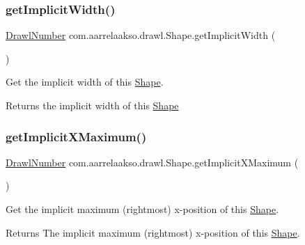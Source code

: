 \subsubsection{\texorpdfstring{get\+Implicit\+Width()}{getImplicitWidth()}}
{\footnotesize\ttfamily \hyperlink{classcom_1_1aarrelaakso_1_1drawl_1_1_drawl_number}{Drawl\+Number} com.\+aarrelaakso.\+drawl.\+Shape.\+get\+Implicit\+Width (\begin{DoxyParamCaption}{ }\end{DoxyParamCaption})\hspace{0.3cm}{\ttfamily [protected]}}



Get the implicit width of this \hyperlink{classcom_1_1aarrelaakso_1_1drawl_1_1_shape}{Shape}. 

\begin{DoxyReturn}{Returns}
the implicit width of this \hyperlink{classcom_1_1aarrelaakso_1_1drawl_1_1_shape}{Shape} 
\end{DoxyReturn}
\mbox{\label{classcom_1_1aarrelaakso_1_1drawl_1_1_shape_ae1820c7d674c6c022b72cc086005131f}} 
\subsubsection{\texorpdfstring{get\+Implicit\+X\+Maximum()}{getImplicitXMaximum()}}
{\footnotesize\ttfamily \hyperlink{classcom_1_1aarrelaakso_1_1drawl_1_1_drawl_number}{Drawl\+Number} com.\+aarrelaakso.\+drawl.\+Shape.\+get\+Implicit\+X\+Maximum (\begin{DoxyParamCaption}{ }\end{DoxyParamCaption})\hspace{0.3cm}{\ttfamily [protected]}}



Get the implicit maximum (rightmost) x-\/position of this \hyperlink{classcom_1_1aarrelaakso_1_1drawl_1_1_shape}{Shape}. 

\begin{DoxyReturn}{Returns}
The implicit maximum (rightmost) x-\/position of this \hyperlink{classcom_1_1aarrelaakso_1_1drawl_1_1_shape}{Shape}. 
\end{DoxyReturn}
\mbox{\label{classcom_1_1aarrelaakso_1_1drawl_1_1_shape_a43b7aaf82c47e231b57622b0346d3ce1}} 
